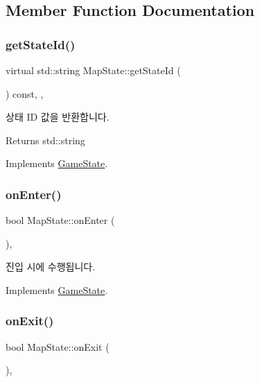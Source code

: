 \subsection{Member Function Documentation}
\mbox{\label{class_map_state_a0434e96d8a597fe7f5cbc6205e4b8f85}} 
\subsubsection{\texorpdfstring{getStateId()}{getStateId()}}
{\footnotesize\ttfamily virtual std\+::string Map\+State\+::get\+State\+Id (\begin{DoxyParamCaption}{ }\end{DoxyParamCaption}) const\hspace{0.3cm}{\ttfamily [inline]}, {\ttfamily [override]}, {\ttfamily [virtual]}}

상태 ID 값을 반환합니다. \begin{DoxyReturn}{Returns}
std\+::string 
\end{DoxyReturn}


Implements \mbox{\hyperlink{class_game_state_a79e985882263b3e2642ad002c03acaa9}{Game\+State}}.

\mbox{\label{class_map_state_aa0a860d4f4c09fa6f7da28a243b1fc37}} 
\subsubsection{\texorpdfstring{onEnter()}{onEnter()}}
{\footnotesize\ttfamily bool Map\+State\+::on\+Enter (\begin{DoxyParamCaption}{ }\end{DoxyParamCaption})\hspace{0.3cm}{\ttfamily [override]}, {\ttfamily [virtual]}}

진입 시에 수행됩니다. 

Implements \mbox{\hyperlink{class_game_state_ac9dd3f269dda278d57d9a1e3e27461da}{Game\+State}}.

\mbox{\label{class_map_state_ab2daa5de8a62640f5373ce69315aac93}} 
\subsubsection{\texorpdfstring{onExit()}{onExit()}}
{\footnotesize\ttfamily bool Map\+State\+::on\+Exit (\begin{DoxyParamCaption}{ }\end{DoxyParamCaption})\hspace{0.3cm}{\ttfamily [override]}, {\ttfamily [virtual]}}

